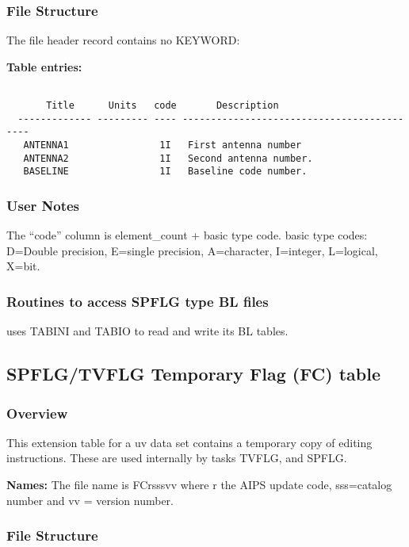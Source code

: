 \subsubsection{File Structure}

The file header record contains no KEYWORD:

{\bf Table entries:}

\begin{verbatim}

       Title      Units   code       Description
  ------------- --------- ---- -------------------------------------------
   ANTENNA1                1I   First antenna number
   ANTENNA2                1I   Second antenna number.
   BASELINE                1I   Baseline code number.

\end{verbatim}

\subsubsection{User Notes}

  The ``code'' column is element\_count + basic type code.
basic type codes: D=Double precision, E=single precision, A=character,
I=integer, L=logical, X=bit.


\subsubsection{Routines to access SPFLG type BL files}

    uses TABINI and TABIO to read and write
its BL tables.

\subsection{SPFLG/TVFLG Temporary Flag (FC) table}
\subsubsection{Overview}

   This extension table for a uv data set contains a temporary copy of
editing instructions.  These are used internally by tasks TVFLG, and
SPFLG.

{\bf Names:} The file name is FCrsssvv where r the AIPS update code,
sss=catalog number and vv = version number.

\subsubsection{File Structure}

